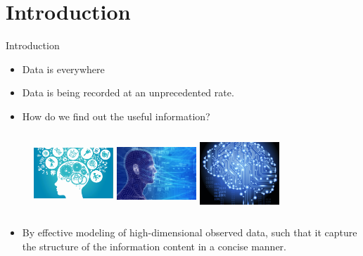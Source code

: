 \documentclass{beamer}
\theoremstyle{plain}
\theoremstyle{definition}
\theoremstyle{plain}
\theoremstyle{plain}
\begin{document}
\section{Introduction}
\begin{frame}{Introduction}
\begin{itemize}
\item Data is everywhere
\item Data is being recorded at an unprecedented rate.
\item How do we find out the useful information?

\end{itemize}

\begin{figure}[!htb]
  \includegraphics[height=3cm,width=3cm]{./figures/I_1.png}
\endminipage\hfill
{}
  \includegraphics[height=3cm,width=3cm]{./figures/I_2.png}
\endminipage\hfill
{}%
  \includegraphics[height=3cm,width=3cm]{./figures/I_3.png}
\endminipage
\end{figure}

\pause

\begin{itemize}
\item By effective modeling of high-dimensional observed data, such that it capture the structure of the information content in a concise manner.
\end{itemize}

\end{frame}
\end{document}
